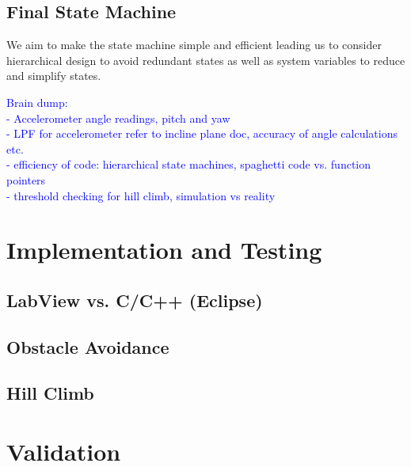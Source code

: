 \documentclass[11pt]{article}
\begin{document}

\subsection{Final State Machine}
We aim to make the state machine simple and efficient leading us to consider hierarchical design to avoid redundant states as well as system variables to reduce and simplify states. 

\textcolor{blue}{Brain dump:\\
- Accelerometer angle readings, pitch and yaw\\
- LPF for accelerometer refer to incline plane doc, accuracy of angle calculations etc.\\
- efficiency of code: hierarchical state machines, spaghetti code vs. function pointers\\
- threshold checking for hill climb, simulation vs reality
}


\section{Implementation and Testing}

\subsection{LabView vs. C/C++ (Eclipse)}

\subsection{Obstacle Avoidance}

\subsection{Hill Climb}

\section{Validation}
\end{document}
